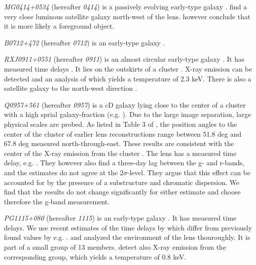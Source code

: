 \documentclass[useAMS,usenatbib]{mn2e}
\begin{document}
\textit{MG0414+0534} (hereafter \textit{0414}) is a passively evolving early-type galaxy \citep{1999AJ....117.2034T}. \cite{1993AJ....105....1S} find a very close luminous satellite galaxy north-west of the lens. \citep{2011MNRAS.413L..86C} however conclude that it is more likely a foreground object.

\textit{B0712+472} (hereafter \textit{0712}) is an early-type galaxy \citep{1998AJ....115..377F}. %

\textit{RXJ0911+0551} (hereafter \textit{0911}) is an almost circular early-type galaxy \citep{2012A&A...538A..99S}. It has measured time delays \citep{2002ApJ...572L..11H}. It lies on the outskirts of a cluster \citep{2001ApJ...555....1M}. X-ray emission can be detected and an analysis of which yields a temperature of 2.3 keV. There is also a satellite galaxy to the north-west direction \citep{2000ApJ...544L..35K}. %

\textit{Q0957+561} (hereafter \textit{0957}) is a cD galaxy lying close to the center of a cluster with a high sprial galaxy-fraction (e.g. \cite{1992MNRAS.254P..27G,1994A&A...291..411A,1998ApJ...504..661C}). Due to the large image separation, large physical scales are probed. As listed in Table 3 of \cite{2000ApJ...542...74K}, the position angles to the center of the cluster of earlier lens reconstructions range between 51.8 deg and 67.8 deg measured north-through-east. These results are consistent with the center of the X-ray emission from the cluster \citep{1998ApJ...504..661C}. The lens has a measured time delay, e.g. \citep{2012A&A...540A.132S}. They however also find a three-day lag between the g- and r-bands, and the estimates do not agree at the 2$\sigma$-level. They argue that this effect can be accounted for by the presence of a substructure and chromatic dispersion. We find that the results do not change significantly for either estimate and choose therefore the g-band measurement.

\textit{PG1115+080} (hereafter \textit{1115}) is an early-type galaxy \citep{2005ApJ...626...51Y}. It has measured time delays. We use recent estimates of the time delays by \cite{2010MNRAS.406.2764T} which differ from previously found values by e.g. \cite{1997ApJ...489...21B}. \cite{2006ApJ...641..169M} and \cite{2011ApJ...726...84W} analyzed the environment of the lens thouroughly. It is part of a small group of 13 members. \cite{2004ApJ...610..686G} detect also X-ray emission from the corresponding group, which yields a temperature of 0.8 keV.
\end{document}
